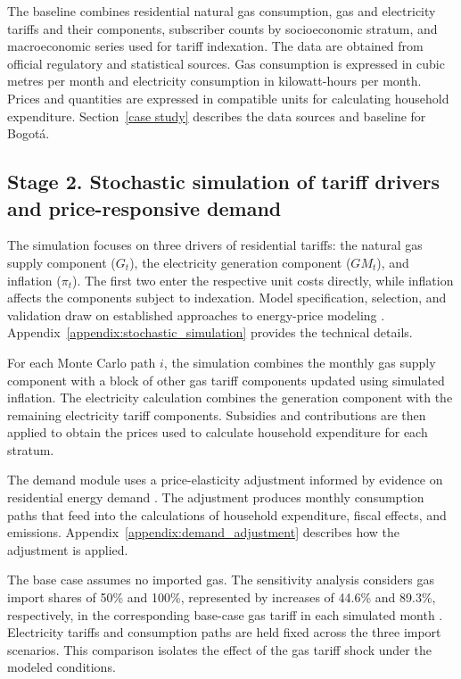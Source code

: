 \documentclass[authoryear,preprint,review,10pt]{elsarticle}
\begin{document}
The baseline combines residential natural gas consumption, gas and electricity tariffs and their components, subscriber counts by socioeconomic stratum, and macroeconomic series used for tariff indexation. The data are obtained from official regulatory and statistical sources. Gas consumption is expressed in cubic metres per month and electricity consumption in kilowatt-hours per month. Prices and quantities are expressed in compatible units for calculating household expenditure. Section~\ref{case study} describes the data sources and baseline for Bogotá.

\subsection{Stage 2. Stochastic simulation of tariff drivers and price-responsive demand}
\label{sec:variable_simulation}

The simulation focuses on three drivers of residential tariffs: the natural gas supply component ($G_t$), the electricity generation component ($GM_t$), and inflation ($\pi_t$). The first two enter the respective unit costs directly, while inflation affects the components subject to indexation. Model specification, selection, and validation draw on established approaches to energy-price modeling \citep{lucia2002electricity,tan2010day,ibrahim2021geometric}. Appendix~\ref{appendix:stochastic_simulation} provides the technical details.

For each Monte Carlo path $i$, the simulation combines the monthly gas supply component with a block of other gas tariff components updated using simulated inflation. The electricity calculation combines the generation component with the remaining electricity tariff components. Subsidies and contributions are then applied to obtain the prices used to calculate household expenditure for each stratum.

The demand module uses a price-elasticity adjustment informed by evidence on residential energy demand \citep{espey2004turning}. The adjustment produces monthly consumption paths that feed into the calculations of household expenditure, fiscal effects, and emissions. Appendix~\ref{appendix:demand_adjustment} describes how the adjustment is applied.

The base case assumes no imported gas. The sensitivity analysis considers gas import shares of 50\% and 100\%, represented by increases of 44.6\% and 89.3\%, respectively, in the corresponding base-case gas tariff in each simulated month \citep{cabrales2025fedesarrollo_gas_imports}. Electricity tariffs and consumption paths are held fixed across the three import scenarios. This comparison isolates the effect of the gas tariff shock under the modeled conditions.
\end{document}
